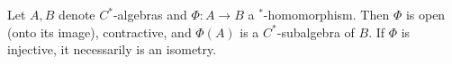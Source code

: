 Let $A, B$ denote $C^*$-algebras and $\Phi : A \to B$ a $^*$-homomorphism. Then $\Phi$ is open (onto its image), contractive, and $\Phi(A)$ is a $C^*$-subalgebra of $B$. If $\Phi$ is injective, it necessarily is an isometry.

